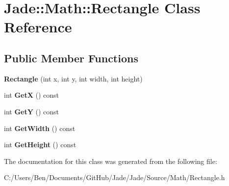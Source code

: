 \hypertarget{class_jade_1_1_math_1_1_rectangle}{}\section{Jade\+:\+:Math\+:\+:Rectangle Class Reference}
\label{class_jade_1_1_math_1_1_rectangle}
\subsection*{Public Member Functions}
\begin{DoxyCompactItemize}
\item 
\hypertarget{class_jade_1_1_math_1_1_rectangle_a8ae29b79cd1a42b5be957a2dfd8ebd48}{}{\bfseries Rectangle} (int x, int y, int width, int height)\label{class_jade_1_1_math_1_1_rectangle_a8ae29b79cd1a42b5be957a2dfd8ebd48}

\item 
\hypertarget{class_jade_1_1_math_1_1_rectangle_a4d92f231d4542d79b0af800bad319098}{}int {\bfseries Get\+X} () const \label{class_jade_1_1_math_1_1_rectangle_a4d92f231d4542d79b0af800bad319098}

\item 
\hypertarget{class_jade_1_1_math_1_1_rectangle_ab6e80e3fa00a13ed67f3176c9ff8a273}{}int {\bfseries Get\+Y} () const \label{class_jade_1_1_math_1_1_rectangle_ab6e80e3fa00a13ed67f3176c9ff8a273}

\item 
\hypertarget{class_jade_1_1_math_1_1_rectangle_a58e1be25c55202c9f3f0546c6dce74c6}{}int {\bfseries Get\+Width} () const \label{class_jade_1_1_math_1_1_rectangle_a58e1be25c55202c9f3f0546c6dce74c6}

\item 
\hypertarget{class_jade_1_1_math_1_1_rectangle_a90461fd0f110fbf563bea19e53145ae0}{}int {\bfseries Get\+Height} () const \label{class_jade_1_1_math_1_1_rectangle_a90461fd0f110fbf563bea19e53145ae0}

\end{DoxyCompactItemize}


The documentation for this class was generated from the following file\+:\begin{DoxyCompactItemize}
\item 
C\+:/\+Users/\+Ben/\+Documents/\+Git\+Hub/\+Jade/\+Jade/\+Source/\+Math/Rectangle.\+h\end{DoxyCompactItemize}
